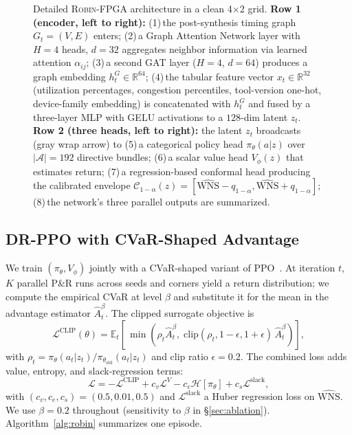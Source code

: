 \documentclass[journal,onecolumn=false]{IEEEtran}
\begin{document}
\begin{figure}[t]
\begin{tikzpicture}[font=\sffamily, every node/.style={inner sep=0pt}]
\end{tikzpicture}
\caption{Detailed \textsc{Robin-FPGA} architecture in a clean 4$\times$2 grid. \textbf{Row 1 (encoder, left to right):} (1)\,the post-synthesis timing graph $G_t=(V,E)$ enters; (2)\,a Graph Attention Network layer with $H{=}4$ heads, $d{=}32$ aggregates neighbor information via learned attention $\alpha_{ij}$; (3)\,a second GAT layer ($H{=}4$, $d{=}64$) produces a graph embedding $h^G_t \in \mathbb{R}^{64}$; (4)\,the tabular feature vector $x_t \in \mathbb{R}^{32}$ (utilization percentages, congestion percentiles, tool-version one-hot, device-family embedding) is concatenated with $h^G_t$ and fused by a three-layer MLP with GELU activations to a $128$-dim latent $z_t$. \textbf{Row 2 (three heads, left to right):} the latent $z_t$ broadcasts (gray wrap arrow) to (5)\,a categorical policy head $\pi_\theta(a|z)$ over $|\mathcal{A}|{=}192$ directive bundles; (6)\,a scalar value head $V_\phi(z)$ that estimates return; (7)\,a regression-based conformal head producing the calibrated envelope $\mathcal{C}_{1-\alpha}(z)=[\widehat{\mathrm{WNS}}{-}q_{1-\alpha},\widehat{\mathrm{WNS}}{+}q_{1-\alpha}]$; (8)\,the network's three parallel outputs are summarized.}
\label{fig:arch}
\end{figure}

\subsection{DR-PPO with CVaR-Shaped Advantage}
We train $(\pi_\theta, V_\phi)$ jointly with a CVaR-shaped variant of PPO~\cite{schulman2017ppo}. At iteration $t$, $K$ parallel P\&R runs across seeds and corners yield a return distribution; we compute the empirical CVaR at level $\beta$ and substitute it for the mean in the advantage estimator $\hat{A}^{\beta}_t$. The clipped surrogate objective is
\begin{equation}
\mathcal{L}^{\text{CLIP}}(\theta) = \mathbb{E}_t\!\left[\, \min\!\left(\rho_t \hat{A}^{\beta}_t,\; \mathrm{clip}(\rho_t, 1{-}\epsilon, 1{+}\epsilon)\, \hat{A}^{\beta}_t \right) \right],
\label{eq:ppoclip}
\end{equation}
with $\rho_t = \pi_\theta(a_t|z_t) / \pi_{\theta_{\text{old}}}(a_t|z_t)$ and clip ratio $\epsilon = 0.2$. The combined loss adds value, entropy, and slack-regression terms:
\begin{equation}
\mathcal{L} = -\mathcal{L}^{\text{CLIP}} + c_v \mathcal{L}^V - c_e \mathcal{H}[\pi_\theta] + c_s \mathcal{L}^{\text{slack}},
\label{eq:loss}
\end{equation}
with $(c_v, c_e, c_s) = (0.5, 0.01, 0.5)$ and $\mathcal{L}^{\text{slack}}$ a Huber regression loss on $\widehat{\mathrm{WNS}}$. We use $\beta = 0.2$ throughout (sensitivity to $\beta$ in \S\ref{sec:ablation}). Algorithm~\ref{alg:robin} summarizes one episode.
\end{document}
